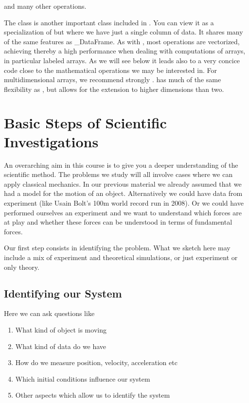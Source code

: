 \documentclass[letterpaper,10pt,english]{sphinxmanual}
\begin{document}
and many other operations.

The  class is another important class included in
. You can view it as a specialization of  but where
we have just a single column of data. It shares many of the same features as \_DataFrame. As with ,
most operations are vectorized, achieving thereby a high performance when dealing with computations of arrays, in particular labeled arrays.
As we will see below it leads also to a very concice code close to the mathematical operations we may be interested in.
For multidimensional arrays, we recommend strongly .  has much of the same flexibility as , but allows for the extension to higher dimensions than two.


\chapter{Basic Steps of Scientific Investigations}
\label{\detokenize{chapter1:basic-steps-of-scientific-investigations}}
An overarching aim in this course is to give you a deeper
understanding of the scientific method. The problems we study will all
involve cases where we can apply classical mechanics. In our previous
material we already assumed that we had a model for the motion of an
object.  Alternatively we could have data from experiment (like Usain
Bolt’s 100m world record run in 2008).  Or we could have performed
ourselves an experiment and we want to understand which forces are at
play and whether these forces can be understood in terms of
fundamental forces.

Our first step consists in identifying the problem. What we sketch
here may include a mix of experiment and theoretical simulations, or
just experiment or only theory.


\section{Identifying our System}
\label{\detokenize{chapter1:identifying-our-system}}
Here we can ask questions like
\begin{enumerate}
%
\item {} 
What kind of object is moving

\item {} 
What kind of data do we have

\item {} 
How do we measure position, velocity, acceleration etc

\item {} 
Which initial conditions influence our system

\item {} 
Other aspects which allow us to identify the system

\end{enumerate}
\end{document}
